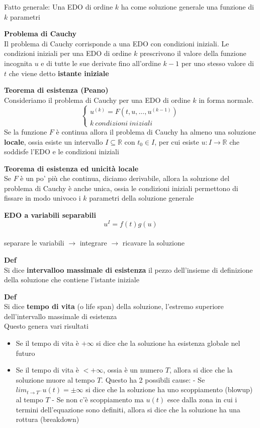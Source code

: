 \documentclass[12pt, a4paper]{article}
\begin{document}
Fatto generale: Una EDO di ordine $k$ ha come soluzione generale una funzione di $k$ parametri

\textbf{Problema di Cauchy}\\Il problema di Cauchy corrisponde a una EDO con condizioni iniziali. Le condizioni
iniziali per una EDO di ordine $k$ prescrivono il valore della funzione incognita $u$ e di tutte le sue
derivate fino all'ordine $k-1$ per uno stesso valore di $t$ che viene detto \textbf{istante iniziale}

\textbf{Teorema di esistenza (Peano)}\\Consideriamo il problema di Cauchy per una EDO di ordine $k$ in forma
normale.\[\begin{cases}
        u^{(k)}=F(t,u,...,u^{(k-1)}) \\
        k\ condizioni\ iniziali
    \end{cases}\] Se la funzione $F$ è continua allora il problema di Cauchy ha almeno una soluzione \textbf{locale},
ossia esiste un intervallo $I\subseteq\mathbb{R}$ con $t_{0}\in I$, per cui esiste $u:I\to\mathbb{R}$ che
soddisfe l'EDO e le condizioni iniziali

\textbf{Teorema di esistenza ed unicità locale}\\Se $F$ è un po' più che continua, diciamo derivabile, allora la
soluzione del problema di Cauchy è anche unica, ossia le condizioni iniziali permettono di fissare in modo univoco
i $k$ parametri della soluzione generale

\textbf{EDO a variabili separabili}\[u^{I}=f(t)g(u)\]\\separare le variabili $\to$ integrare $\to$ ricavare la
soluzione

\textbf{Def}\\Si dice \textbf{intervalloo massimale di esistenza} il pezzo dell'insieme di definizione della
soluzione che contiene l'istante iniziale

\textbf{Def}\\Si dice \textbf{tempo di vita} (o life span) della soluzione, l'estremo superiore dell'intervallo
massimale di esistenza\\Questo genera vari risultati
\begin{itemize}
    \item Se il tempo di vita è $+\infty$ si dice che la soluzione ha esistenza globale nel futuro
    \item Se il tempo di vita è $<+\infty$, ossia è un numero $T$, allora si dice che la soluzione muore al tempo
          $T$. Questo ha 2 possibili cause:
          \subitem - Se $lim_{t\to T^{-}}u(t)=\pm\infty$ si dice che la soluzione ha uno scoppiamento (blowup) al tempo $T$
          \subitem - Se non c'è scoppiamento ma $u(t)$ esce dalla zona in cui i termini dell'equazione sono definiti,
          allora si dice che la soluzione ha una rottura (breakdown)
\end{itemize}
\end{document}
